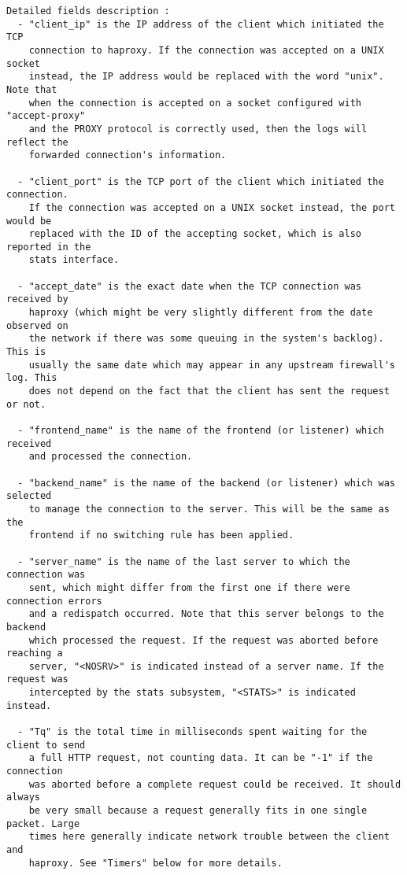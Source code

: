\begin{verbatim}
Detailed fields description :
  - "client_ip" is the IP address of the client which initiated the TCP
    connection to haproxy. If the connection was accepted on a UNIX socket
    instead, the IP address would be replaced with the word "unix". Note that
    when the connection is accepted on a socket configured with "accept-proxy"
    and the PROXY protocol is correctly used, then the logs will reflect the
    forwarded connection's information.

  - "client_port" is the TCP port of the client which initiated the connection.
    If the connection was accepted on a UNIX socket instead, the port would be
    replaced with the ID of the accepting socket, which is also reported in the
    stats interface.

  - "accept_date" is the exact date when the TCP connection was received by
    haproxy (which might be very slightly different from the date observed on
    the network if there was some queuing in the system's backlog). This is
    usually the same date which may appear in any upstream firewall's log. This
    does not depend on the fact that the client has sent the request or not.

  - "frontend_name" is the name of the frontend (or listener) which received
    and processed the connection.

  - "backend_name" is the name of the backend (or listener) which was selected
    to manage the connection to the server. This will be the same as the
    frontend if no switching rule has been applied.

  - "server_name" is the name of the last server to which the connection was
    sent, which might differ from the first one if there were connection errors
    and a redispatch occurred. Note that this server belongs to the backend
    which processed the request. If the request was aborted before reaching a
    server, "<NOSRV>" is indicated instead of a server name. If the request was
    intercepted by the stats subsystem, "<STATS>" is indicated instead.

  - "Tq" is the total time in milliseconds spent waiting for the client to send
    a full HTTP request, not counting data. It can be "-1" if the connection
    was aborted before a complete request could be received. It should always
    be very small because a request generally fits in one single packet. Large
    times here generally indicate network trouble between the client and
    haproxy. See "Timers" below for more details.


\end{verbatim}
